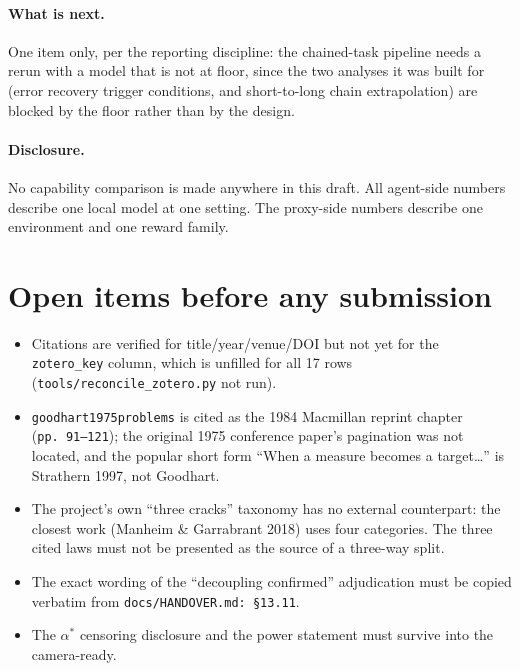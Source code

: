 \documentclass[11pt]{article}
\begin{document}
\paragraph{What is next.} One item only, per the reporting discipline: the
chained-task pipeline needs a rerun with a model that is not at floor, since
the two analyses it was built for (error recovery trigger conditions, and
short-to-long chain extrapolation) are blocked by the floor rather than by the
design.

\paragraph{Disclosure.} No capability comparison is made anywhere in this
draft. All agent-side numbers describe one local model at one setting. The
proxy-side numbers describe one environment and one reward family.

\section*{Open items before any submission}
\begin{itemize}
  \item Citations are verified for title/year/venue/DOI but not yet for the
        \texttt{zotero\_key} column, which is unfilled for all 17 rows
        (\texttt{tools/reconcile\_zotero.py} not run).
  \item \texttt{goodhart1975problems} is cited as the 1984 Macmillan reprint
        chapter (\texttt{pp.\ 91--121}); the original 1975 conference paper's
        pagination was not located, and the popular short form
        ``When a measure becomes a target\ldots'' is Strathern 1997, not Goodhart.
  \item The project's own ``three cracks'' taxonomy has no external counterpart:
        the closest work (Manheim \& Garrabrant 2018) uses four categories. The
        three cited laws must not be presented as the source of a three-way split.
  \item The exact wording of the ``decoupling confirmed'' adjudication must
        be copied verbatim from \texttt{docs/HANDOVER.md:\,\S13.11}.
  \item The $\alpha^{*}$ censoring disclosure and the power statement must
        survive into the camera-ready.
\end{itemize}

\nocite{amodei2016concrete,pan2022effects,wei2022chain,ross2011reduction,
kwa2025measuring,schulman2017proximal,raffin2021stable,barto1983neuronlike,
nosek2018preregistration,pineau2021improving,ji2023alignment,morris2024levels}



\end{document}
